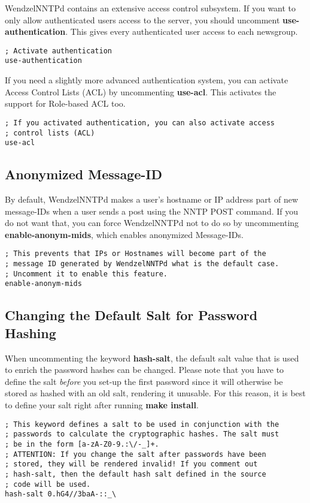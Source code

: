 WendzelNNTPd contains an extensive access control subsystem. If you want to only allow authenticated users access to the server, you should uncomment \textbf{use-authentication}. This gives every authenticated user access to each newsgroup.

\begin{verbatim}
; Activate authentication
use-authentication
\end{verbatim}

If you need a slightly more advanced authentication system, you can activate Access Control Lists (ACL) by uncommenting \textbf{use-acl}. This activates the support for Role-based ACL too.

\begin{verbatim}
; If you activated authentication, you can also activate access
; control lists (ACL)
use-acl
\end{verbatim}

\subsection{Anonymized Message-ID}

By default, WendzelNNTPd makes a user's hostname or IP address part of new message-IDs when a user sends a post using the NNTP POST command. If you do not want that, you can force WendzelNNTPd not to do so by uncommenting \textbf{enable-anonym-mids}, which enables anonymized Message-IDs.

\begin{verbatim}
; This prevents that IPs or Hostnames will become part of the
; message ID generated by WendzelNNTPd what is the default case.
; Uncomment it to enable this feature.
enable-anonym-mids
\end{verbatim}

\subsection{Changing the Default Salt for Password Hashing}

When uncommenting the keyword \textbf{hash-salt}, the default salt value that is used to enrich the password hashes can be changed. Please note that you have to define the salt \textit{before} you set-up the first password since it will otherwise be stored as hashed with an old salt, rendering it unusable. For this reason, it is best to define your salt right after running \textbf{make install}.

\begin{verbatim}
; This keyword defines a salt to be used in conjunction with the
; passwords to calculate the cryptographic hashes. The salt must
; be in the form [a-zA-Z0-9.:\/-_]+.
; ATTENTION: If you change the salt after passwords have been
; stored, they will be rendered invalid! If you comment out
; hash-salt, then the default hash salt defined in the source
; code will be used.
hash-salt 0.hG4//3baA-::_\
\end{verbatim}

